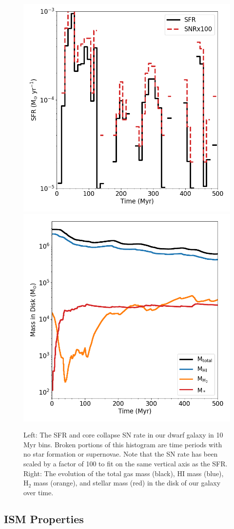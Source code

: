 \begin{figure}
\centering
\includegraphics[width=0.475\linewidth]{figures/ch1/sfr_snrx100}
\includegraphics[width=0.475\linewidth]{figures/ch1/mass_evolution}
\caption{Left: The SFR and core collapse SN rate in our dwarf galaxy in 10 Myr bins. Broken portions of this histogram are time periods with no star formation or supernovae.  Note that the SN rate has been scaled by a factor of 100 to fit on the same vertical axis as the SFR. Right: The evolution of the total gas mass (black), HI mass (blue), H$_2$ mass (orange), and stellar mass (red) in the disk of our galaxy over time.}
\label{ch1:fig:sfr_mass_evolution}
\end{figure}

\subsection{ISM Properties}
\label{ch1:sec:phase}

